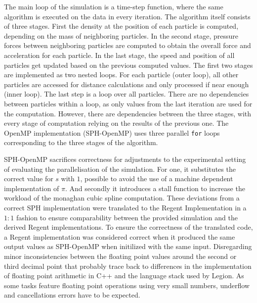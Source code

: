 \documentclass{article}      %
\begin{document}
The main loop of the simulation is a time-step function, where the same algorithm is executed on the data in every iteration. The algorithm itself consists of three stages. First the density at the position of each particle is computed, depending on the mass of neighboring particles. In the second stage, pressure forces between neighboring particles are computed to obtain the overall force and acceleration for each particle. In the last stage, the speed and position of all particles get updated based on the previous computed values. The first two stages are implemented as two nested loops. For each particle (outer loop), all other particles are accessed for distance calculations and only processed if near enough (inner loop). The last step is a loop over all particles. There are no dependencies between particles within a loop, as only values from the last iteration are used for the computation. However, there are dependencies between the three stages, with every stage of computation relying on the results of the previous one. The OpenMP implementation (SPH-OpenMP) uses three parallel \lstinline{for} loops corresponding to the three stages of the algorithm.

SPH-OpenMP sacrifices correctness for adjustments to the experimental setting of evaluating the parallelisation of the simulation. For one, it substitutes the correct value for $s$ with $1$, possible to avoid the use of a machine dependent implementation of $\pi$. And secondly it introduces a stall function to increase the workload of the monaghan cubic spline computation. These deviations from a correct SPH implementation were translated to the Regent Implementation in a $1:1$ fashion to ensure comparability between the provided simulation and the derived Regent implementations. To ensure the correctness of the translated code, a Regent implementation was considered correct when it produced the same output values as SPH-OpenMP when initilized with the same input. Disregarding minor inconsistencies between the floating point values around the second or third decimal point that probably trace back to differences in the implementation of floating point arithmetic in C++ and the language stack used by Legion. As some tasks feature floating point operations using very small numbers, underflow and cancellations errors have to be expected.
\end{document}
